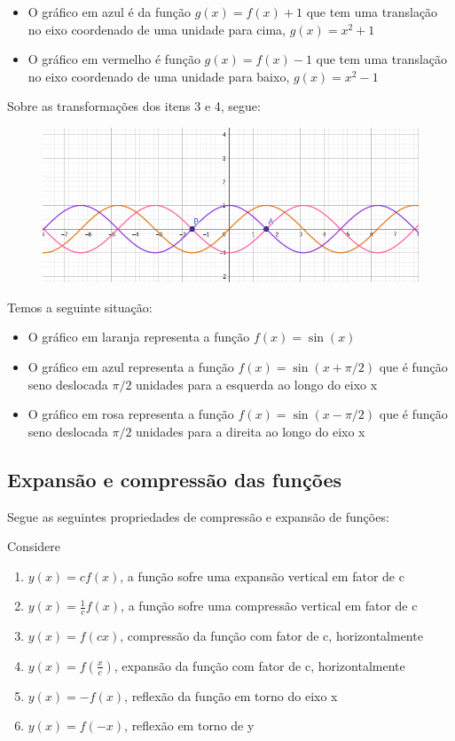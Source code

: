 \begin{multicols*}{2}
\begin{itemize}[wide, labelwidth=!, labelindent=0pt]
        \item O gráfico em azul é da função $g(x) = f(x) + 1$ que tem uma translação no eixo 							coordenado de uma unidade para cima, $g(x) = x^2 + 1 $
        \item O gráfico em vermelho é função $g(x) = f(x) - 1$ que tem uma translação no eixo 							coordenado de uma unidade para baixo, $g(x) = x^2 -1$
    \end{itemize}
    Sobre as transformações dos itens 3 e 4, segue:
    \begin{figure}[H]
        \centering
        \includegraphics[scale=0.25]{assets/rafael/img8.png}
    \end{figure}
    Temos a seguinte situação:
    \begin{itemize}[wide, labelwidth=!, labelindent=0pt]
        \item O gráfico em laranja representa a função $f(x) = \sin(x)$
        \item O gráfico em azul representa a função $f(x) = \sin(x + \pi/2)$ que é função seno 							deslocada $\pi/2$ unidades para a esquerda ao longo do eixo x
        \item O gráfico em rosa representa a função $f(x) = \sin(x - \pi/2)$ que é função seno 							deslocada $\pi/2$ unidades para a direita ao longo do eixo x
    \end{itemize}
    \subsection*{Expansão e compressão das funções}
    Segue as seguintes propriedades de compressão e expansão de funções:

    Considere
    \begin{enumerate}[wide, labelwidth=!, labelindent=0pt]
        \item $y(x) = cf(x)$, a função sofre uma expansão vertical em fator de c
        \item $y(x) = \frac{1}{c} f(x)$, a função sofre uma compressão vertical em fator de c
        \item $ y(x) = f(cx)$, compressão da função com fator de c, horizontalmente
        \item $y(x) = f(\frac{x}{c})$, expansão da função com fator de c, horizontalmente
        \item $y(x) = -f(x)$, reflexão da função em torno do eixo x
        \item $y(x)  = f(-x)$, reflexão em torno de y
    \end{enumerate}


\end{multicols*}
